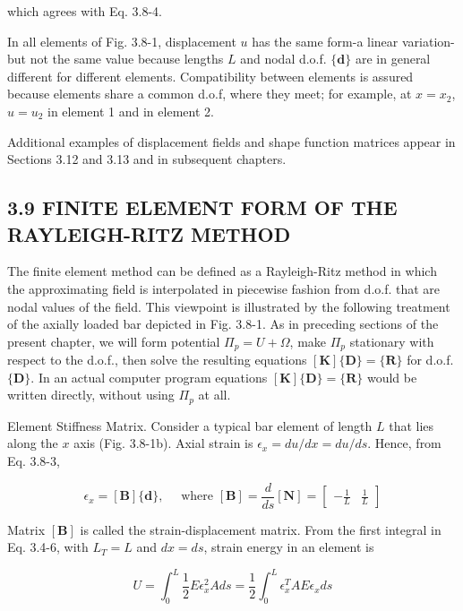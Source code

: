 \documentclass[10pt]{article}
\begin{document}
which agrees with Eq. 3.8-4.

In all elements of Fig. 3.8-1, displacement $u$ has the same form-a linear variation-but not the same value because lengths $L$ and nodal d.o.f. $\{\mathbf{d}\}$ are in general different for different elements. Compatibility between elements is assured because elements share a common d.o.f, where they meet; for example, at $x=x_{2}$, $u=u_{2}$ in element 1 and in element 2.

Additional examples of displacement fields and shape function matrices appear in Sections 3.12 and 3.13 and in subsequent chapters.

\subsection*{3.9 FINITE ELEMENT FORM OF THE RAYLEIGH-RITZ METHOD}
The finite element method can be defined as a Rayleigh-Ritz method in which the approximating field is interpolated in piecewise fashion from d.o.f. that are nodal values of the field. This viewpoint is illustrated by the following treatment of the axially loaded bar depicted in Fig. 3.8-1. As in preceding sections of the present chapter, we will form potential $\Pi_{p}=U+\Omega$, make $\Pi_{p}$ stationary with respect to the d.o.f., then solve the resulting equations $[\mathbf{K}]\{\mathbf{D}\}=\{\mathbf{R}\}$ for d.o.f. $\{\mathbf{D}\}$. In an actual computer program equations $[\mathbf{K}]\{\mathbf{D}\}=\{\mathbf{R}\}$ would be written directly, without using $\Pi_{p}$ at all.

Element Stiffness Matrix. Consider a typical bar element of length $L$ that lies along the $x$ axis (Fig. 3.8-1b). Axial strain is $\epsilon_{x}=d u / d x=d u / d s$. Hence, from Eq. 3.8-3,

\begin{equation*}
\epsilon_{x}=[\mathbf{B}]\{\mathbf{d}\}, \quad \text { where } [\mathbf{B}]=\frac{d}{d s}[\mathbf{N}]=\begin{bmatrix}-\frac{1}{L} & \frac{1}{L}\end{bmatrix} \tag{3.9-1}
\end{equation*}

Matrix $[\mathbf{B}]$ is called the strain-displacement matrix. From the first integral in Eq. 3.4-6, with $L_{T}=L$ and $d x=d s$, strain energy in an element is

\begin{equation*}
U=\int_{0}^{L} \frac{1}{2} E \epsilon_{x}^{2} A d s=\frac{1}{2} \int_{0}^{L} \epsilon_{x}^{T} A E \epsilon_{x} d s \tag{3.9-2}
\end{equation*}
\end{document}
